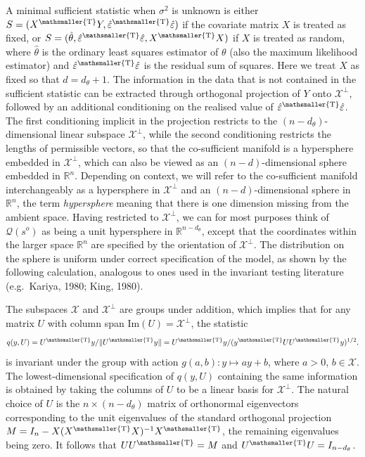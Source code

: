 \documentclass[10pt, reqno]{amsart}
\numberwithin{equation}{section}
\newcommand{\cosuff}{\mathcal{Q}}
\newcommand{\RR}{\mathbb{R}}
\newcommand{\T}{{\mathsmaller {\rm T}}}
\begin{document}
A minimal sufficient statistic when $\sigma^2$ is unknown is either $S=(X^\T Y,\hat{\varepsilon}^\T\hat{\varepsilon})$ if the covariate matrix $X$ is treated as fixed, or $S=(\hat{\theta},\hat{\varepsilon}^\T\hat{\varepsilon}, X^{\T} X)$ if $X$ is treated as random, where $\hat\theta$ is the ordinary least squares estimator of $\theta$ (also the maximum likelihood estimator) and $\hat{\varepsilon}^\T\hat{\varepsilon}$ is the residual sum of squares. Here we treat $X$ as fixed so that $d=d_\theta+1$. The information in the data that is not contained in the sufficient statistic can be extracted through orthogonal projection of $Y$ onto $\mathcal{X}^\perp$, followed by an additional conditioning on the realised value of $\hat{\varepsilon}^\T\hat{\varepsilon}$. The first conditioning implicit in the projection restricts to the $(n-d_\theta)$-dimensional linear subspace $\mathcal{X}^\perp$, while the second conditioning restricts the lengths of permissible vectors, so that the co-sufficient manifold is a hypersphere embedded in $\mathcal{X}^\perp$, which can also be viewed as an $(n-d)$-dimensional sphere embedded in $\RR^n$. Depending on context, we will refer to the co-sufficient manifold interchangeably as a hypersphere in $\mathcal{X}^\perp$ and an $(n-d)$-dimensional sphere in $\RR^n$, the term \emph{hypersphere} meaning that there is one dimension missing from the ambient space. Having restricted to $\mathcal{X}^\perp$, we can for most purposes think of $\cosuff(s^o)$ as being a unit hypersphere in $\RR^{n-d_\theta}$, except that the coordinates within the larger space $\RR^n$ are specified by the orientation of $\mathcal{X}^\perp$. The distribution on the sphere is uniform under correct specification of the model, as shown by the following calculation, analogous to ones used in the invariant testing literature (e.g.~Kariya, 1980; King, 1980). 

The subspaces $\mathcal{X}$ and $\mathcal{X}^\perp$ are groups under addition, which implies that for any matrix $U$ with column span $\text{Im}(U)= \mathcal{X}^\perp$, the statistic
\begin{equation}\label{eqInvariant}
	q(y,U)= U^\T y /\|U^\T y\| = U^\T y/(y^\T U U^\T y)^{1/2}.
\end{equation}
%
is invariant under the group with action $g(a,b):y\mapsto ay + b$, where $a>0$, $b\in \mathcal{X}$. The lowest-dimensional specification of $q(y,U)$ containing the same information is obtained by taking the columns of $U$ to be a linear basis for $\mathcal{X}^\perp$. The natural choice of $U$ is the $n\times (n-d_\theta)$ matrix of orthonormal eigenvectors corresponding to the unit eigenvalues of the standard orthogonal projection $M=I_{n} - X(X^\T X)^{-1} X^\T$, the remaining eigenvalues being zero. It follows that $UU^\T = M$ and $U^\T U = I_{n-d_\theta}$. 
\end{document}
